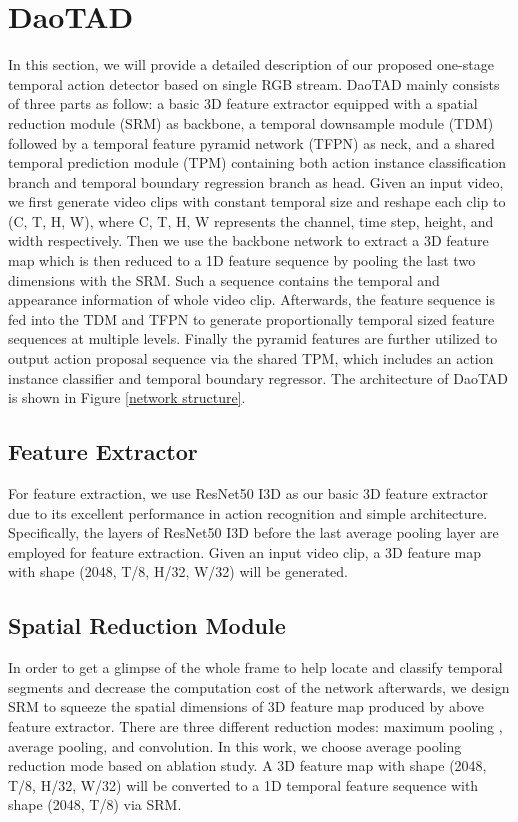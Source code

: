 \documentclass[final]{cvpr}
\begin{document}
\section{DaoTAD}
In this section, we will provide a detailed description of our proposed one-stage temporal action detector based on single RGB stream. DaoTAD mainly consists of three parts as follow: a basic 3D feature extractor equipped with a spatial reduction module (SRM) as backbone, a temporal downsample module (TDM) followed by a temporal feature pyramid network (TFPN) as neck, and a shared temporal prediction module (TPM) containing both action instance classification branch and temporal boundary regression branch as head. Given an input video, we first generate video clips with constant temporal size and reshape each clip to (C, T, H, W), where C, T, H, W represents the channel, time step, height, and width respectively. Then we use the backbone network to extract a 3D feature map which is then reduced to a 1D feature sequence by pooling the last two dimensions with the SRM. Such a sequence contains the temporal and appearance information of whole video clip. Afterwards, the feature sequence is fed into the TDM and TFPN to generate proportionally temporal sized feature sequences at multiple levels. Finally the pyramid features are further utilized to output action proposal sequence via the shared TPM, which includes an action instance classifier and temporal boundary regressor. The architecture of DaoTAD is shown in Figure \ref{network structure}.

\subsection{Feature Extractor}
For feature extraction, we use ResNet50 I3D \cite{wang2018non} as our basic 3D feature extractor due to its excellent performance in action recognition and simple architecture. Specifically, the layers of ResNet50 I3D before the last average pooling layer are employed for feature extraction. Given an input video clip, a 3D feature map with shape (2048, T/8, H/32, W/32) will be generated.

\subsection{Spatial Reduction Module}
\label{subsection:SRM}
In order to get a glimpse of the whole frame to help locate and classify temporal segments and decrease the computation cost of the network afterwards, we design SRM to squeeze the spatial dimensions of 3D feature map produced by above feature extractor. There are three different reduction modes: maximum pooling , average pooling, and convolution. In this work, we choose average pooling reduction mode based on ablation study. A 3D feature map with shape (2048, T/8, H/32, W/32) will be converted to a 1D temporal feature sequence with shape (2048, T/8) via SRM.
\end{document}
